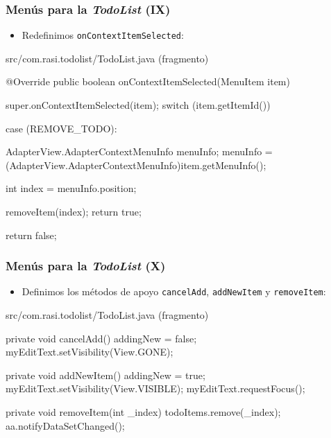 \documentclass[hyperref={pdfpagelabels=true},ucs]{beamer}
\begin{document}
\begin{frame}[fragile]
\frametitle{Menús para la \emph{TodoList} (IX)}

\begin{itemize}
\item Redefinimos \verb|onContextItemSelected|:
\end{itemize}

\begin{tiny}
\begin{block}{src/com.rasi.todolist/TodoList.java (fragmento)}
\begin{java}
@Override
public boolean onContextItemSelected(MenuItem item) {
  super.onContextItemSelected(item);
  switch (item.getItemId()) {
    case (REMOVE_TODO): {
      AdapterView.AdapterContextMenuInfo menuInfo;
      menuInfo =(AdapterView.AdapterContextMenuInfo)item.getMenuInfo();

      int index = menuInfo.position;

      removeItem(index);
      return true;
    }
  }
  return false;
}

\end{java}
\end{block}
\end{tiny}

\end{frame}

\begin{frame}[fragile]
\frametitle{Menús para la \emph{TodoList} (X)}

\begin{itemize}
\item Definimos los métodos de apoyo \verb|cancelAdd|,
  \verb|addNewItem| y \verb|removeItem|:
\end{itemize}

\begin{tiny}
\begin{block}{src/com.rasi.todolist/TodoList.java (fragmento)}
\begin{java}
private void cancelAdd() {
  addingNew = false;
  myEditText.setVisibility(View.GONE);
}

private void addNewItem() {
  addingNew = true;
  myEditText.setVisibility(View.VISIBLE);
  myEditText.requestFocus();
}

private void removeItem(int _index) {
  todoItems.remove(_index);
  aa.notifyDataSetChanged();
}
\end{java}
\end{block}
\end{tiny}

\end{frame}
\end{document}

